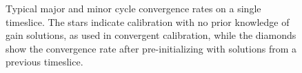 \documentclass{aa}
\begin{document}




\begin{figure}[tbh]

\caption{\label{fig:Convergence-behaviour-of}Typical   major  and   minor  cycle
  convergence rates on  a single timeslice. The stars  indicate calibration with
  no prior knowledge of gain solutions, as used in convergent calibration, while
  the diamonds  show the convergence rate after  pre-initializing with solutions
  from a previous timeslice.}
\end{figure}
\end{document}
